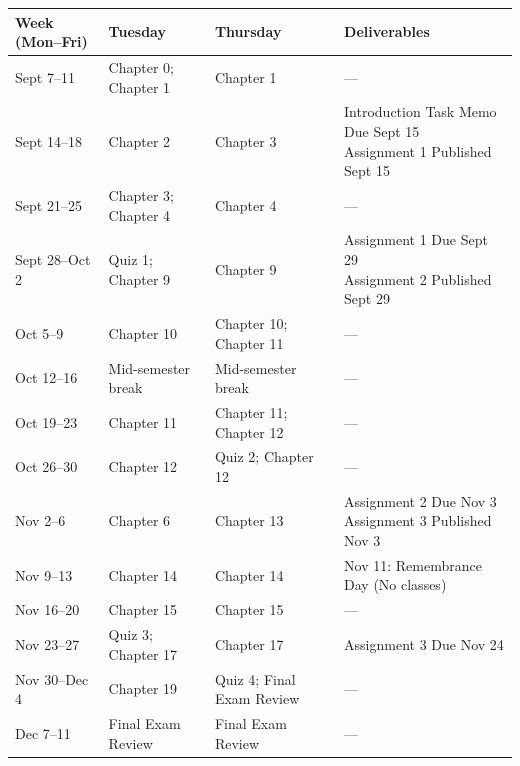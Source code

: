 \documentclass[10pt]{article}
\begin{document}
\begin{center}
\small
\renewcommand{\arraystretch}{1.15}

\begin{tabular}{@{}p{3cm}p{4cm}p{4cm}p{6cm}@{}}
\toprule
\textbf{Week (Mon--Fri)} &
\textbf{Tuesday} &
\textbf{Thursday} &
\textbf{Deliverables} \\
\midrule

Sept 7--11 &
Chapter 0; Chapter 1 &
Chapter 1 &
--- \\

Sept 14--18 &
Chapter 2 &
Chapter 3 &
\makecell{Introduction Task Memo Due Sept 15 \\ Assignment 1 Published Sept 15}  \\

Sept 21--25 &
Chapter 3; Chapter 4 &
Chapter 4 &
--- \\

Sept 28--Oct 2 &
Quiz 1; Chapter 9&
Chapter 9 &
\makecell{Assignment 1 Due Sept 29 \\ Assignment 2 Published Sept 29}  \\

Oct 5--9 &
Chapter 10 &
Chapter 10; Chapter 11 &
--- \\

Oct 12--16 &
Mid-semester break &
Mid-semester break &
--- \\

Oct 19--23 &
Chapter 11 &
Chapter 11; Chapter 12 &
--- \\

Oct 26--30 &
Chapter 12 &
Quiz 2; Chapter 12 &
--- \\

Nov 2--6 &
Chapter 6 &
Chapter 13 &
\makecell{Assignment 2 Due Nov 3 \\ Assignment 3 Published Nov 3}  \\

Nov 9--13 &
Chapter 14 &
Chapter 14 &
Nov 11: Remembrance Day (No classes) \\

Nov 16--20 &
Chapter 15 &
Chapter 15 &
--- \\

Nov 23--27 &
Quiz 3; Chapter 17 &
Chapter 17 &
Assignment 3 Due Nov 24 \\

Nov 30--Dec 4 &
Chapter 19 &
Quiz 4; Final Exam Review &
--- \\

Dec 7--11 &
Final Exam Review &
Final Exam Review &
--- \\

\bottomrule
\end{tabular}

\end{center}
\end{document}
